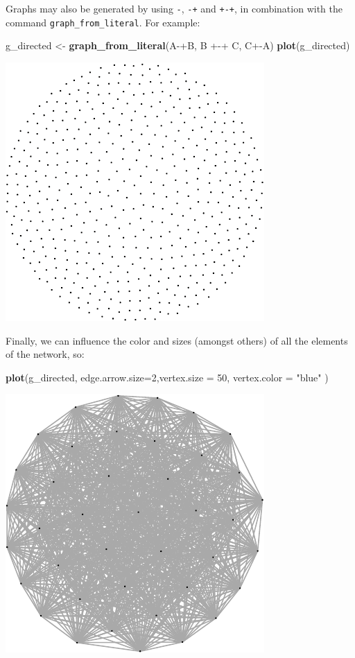 \documentclass[]{article}
\newenvironment{Shaded}{\begin{snugshade}}{\end{snugshade}}
\newcommand{\KeywordTok}[1]{\textcolor[rgb]{0.13,0.29,0.53}{\textbf{{#1}}}}
\newcommand{\DataTypeTok}[1]{\textcolor[rgb]{0.13,0.29,0.53}{{#1}}}
\newcommand{\DecValTok}[1]{\textcolor[rgb]{0.00,0.00,0.81}{{#1}}}
\newcommand{\StringTok}[1]{\textcolor[rgb]{0.31,0.60,0.02}{{#1}}}
\newcommand{\NormalTok}[1]{{#1}}
\theoremstyle{definition}
\theoremstyle{definition}
\theoremstyle{definition}
\theoremstyle{remark}
\begin{document}
Graphs may also be generated by using \texttt{-}, \texttt{-+} and
\texttt{+-+}, in combination with the command
\texttt{graph\_from\_literal}. For example:

\begin{Shaded}
\begin{Highlighting}[]
\NormalTok{g_directed <-}\StringTok{ }\KeywordTok{graph_from_literal}\NormalTok{(A-+B, B +-+}\StringTok{ }\NormalTok{C, C+-A)}
\KeywordTok{plot}\NormalTok{(g_directed)}
\end{Highlighting}
\end{Shaded}

\includegraphics{ResearchTools_files/figure-latex/unnamed-chunk-49-1.pdf}

Finally, we can influence the color and sizes (amongst others) of all
the elements of the network, so:

\begin{Shaded}
\begin{Highlighting}[]
\KeywordTok{plot}\NormalTok{(g_directed, }\DataTypeTok{edge.arrow.size=}\DecValTok{2}\NormalTok{,}\DataTypeTok{vertex.size =} \DecValTok{50}\NormalTok{, }\DataTypeTok{vertex.color =} \StringTok{"blue"} \NormalTok{)}
\end{Highlighting}
\end{Shaded}

\includegraphics{ResearchTools_files/figure-latex/unnamed-chunk-50-1.pdf}
\end{document}
